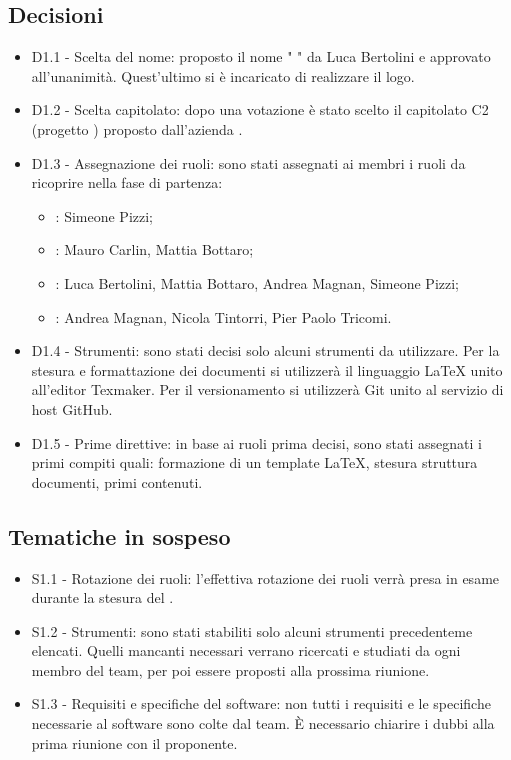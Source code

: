 \documentclass[a4paper,titlepage]{article}
\begin{document}
 \subsection{Decisioni}
 \begin{itemize}
  \item D1.1 - Scelta del nome: proposto il nome " \GRUPPO{} " da Luca Bertolini e approvato all'unanimità. Quest'ultimo si è incaricato di realizzare il logo.
  \item D1.2 - Scelta capitolato: dopo una votazione è stato scelto il capitolato C2 (progetto \PROGETTO) proposto dall'azienda \PROPONENTE.
  \item D1.3 - Assegnazione dei ruoli: sono stati assegnati ai membri i ruoli da ricoprire nella fase di partenza:
  \begin{itemize}
  \item \RESP: Simeone Pizzi;
  \item \AMMP: Mauro Carlin, Mattia Bottaro;
  \item \VERP: Luca Bertolini, Mattia Bottaro, Andrea Magnan, Simeone Pizzi;
  \item \ANP: Andrea Magnan, Nicola Tintorri, Pier Paolo Tricomi.
  \end{itemize}
  \item D1.4 - Strumenti: sono stati decisi solo alcuni strumenti da utilizzare. Per la stesura e formattazione dei documenti si utilizzerà il linguaggio \LaTeX{} unito all'editor Texmaker. Per il versionamento si utilizzerà Git unito al servizio di host GitHub. 
  \item D1.5 - Prime direttive: in base ai ruoli prima decisi, sono stati assegnati i primi compiti quali: formazione di un template \LaTeX{}, stesura struttura documenti, primi contenuti.
 \end{itemize}

\subsection{Tematiche in sospeso} 
  \begin{itemize}
  \item S1.1 - Rotazione dei ruoli: l'effettiva rotazione dei ruoli verrà presa in esame durante la stesura del \PPdoc.
  \item S1.2 - Strumenti: sono stati stabiliti solo alcuni strumenti precedenteme elencati. Quelli mancanti necessari verrano ricercati e studiati da ogni membro del team, per poi essere proposti alla prossima riunione.
  \item S1.3 - Requisiti e specifiche del software: non tutti i requisiti e le specifiche necessarie al software sono colte dal team. È necessario chiarire i dubbi alla prima riunione con il proponente.
  \end{itemize}
\end{document}
